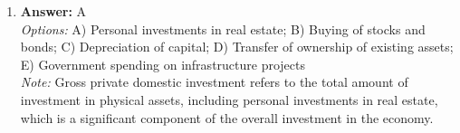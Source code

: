 \documentclass[12pt]{article}
\begin{document}
\begin{enumerate}[label=\arabic*.]
\\ \textit{Note:} The Wagner Act is considered "labor's Magna Charta" because it established fundamental rights for workers to organize and engage in collective bargaining, thus significantly enhancing their economic power and influence in the workplace, akin to the protections and rights granted by the historical Magna Carta.
\item \textbf{Answer:} A
\\ \textit{Options:} A) Personal investments in real estate; B) Buying of stocks and bonds; C) Depreciation of capital; D) Transfer of ownership of existing assets; E) Government spending on infrastructure projects
\\ \textit{Note:} Gross private domestic investment refers to the total amount of investment in physical assets, including personal investments in real estate, which is a significant component of the overall investment in the economy.
\end{enumerate}
\end{document}
